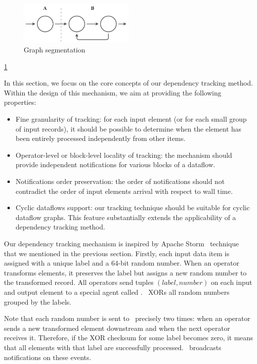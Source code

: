 \label{fs-acker-design}

\begin{figure}[htbp]
  \centering
  \includegraphics[width=0.5\textwidth]{pics/graph-segments.pdf}
  \caption{Graph segmentation}
  \label{graph-segments}
\end{figure}

\ref{graph-segments}

In this section, we focus on the core concepts of our dependency tracking method. Within the design of this mechanism, we aim at providing the following properties:
\begin{itemize}
    \item Fine granularity of tracking: for each input element (or for each small group of input records), it should be possible to determine when the element has been entirely processed independently from other items.
    \item Operator-level or block-level locality of tracking: the mechanism should provide independent notifications for various blocks of a dataflow.
    \item Notifications order preservation: the order of notifications should not contradict the order of input elements arrival with respect to wall time.
    \item Cyclic dataflows support: our tracking technique should be suitable for cyclic dataflow graphs. This feature substantially extends the applicability of a dependency tracking method.
\end{itemize}

Our dependency tracking mechanism is inspired by Apache Storm \acker\ technique that we mentioned in the previous section. Firstly, each input data item is assigned with a unique label and a 64-bit random number. When an operator transforms elements, it preserves the label but assigns a new random number to the transformed record. All operators send tuples $(label, number)$ on each input and output element to a special agent called \acker . \acker\ XORs all random numbers grouped by the labels. 

Note that each random number is sent to \acker\ precisely two times: when an operator sends a new transformed element downstream and when the next operator receives it. Therefore, if the XOR checksum for some label becomes zero, it means that all elements with that label are successfully processed. \acker\ broadcasts notifications on these events.

